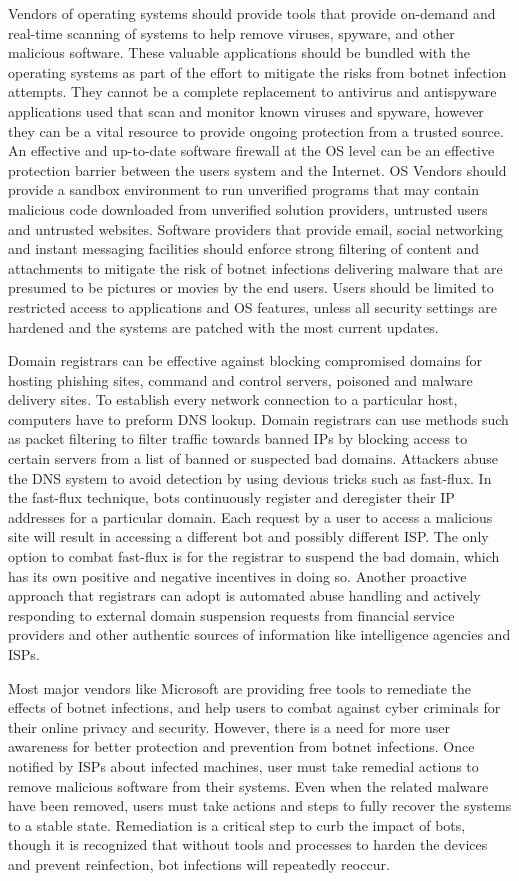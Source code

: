 Vendors of operating systems should provide tools that provide on-demand and real-time scanning of systems to help remove viruses, spyware, and other malicious software. These valuable applications should be bundled with the operating systems as part of the effort to mitigate the risks from botnet infection attempts. They cannot be a complete replacement to antivirus and antispyware applications used that scan and monitor known viruses and spyware, however they can be a vital resource to provide ongoing protection from a trusted source. An effective and up-to-date software firewall at the OS level can be an effective protection barrier between the users system and the Internet. OS Vendors should provide a sandbox environment to run unverified programs that may contain malicious code downloaded from unverified solution providers, untrusted users and untrusted websites. Software providers that provide email, social networking and instant messaging facilities should enforce strong filtering of content and attachments to mitigate the risk of botnet infections delivering malware that are presumed to be pictures or movies by the end users. Users should be limited to restricted access to applications and OS features, unless all security settings are hardened and the systems are patched with the most current updates.	

Domain registrars can be effective against blocking compromised domains for hosting phishing sites, command and control servers, poisoned and malware delivery sites. To establish every network connection to a particular host, computers have to preform DNS lookup. Domain registrars can use methods such as packet filtering to filter traffic towards banned IPs by blocking access to certain servers from a list of banned or suspected bad domains. Attackers abuse the DNS system to avoid detection by using devious tricks such as fast-flux. In the fast-flux technique, bots continuously register and deregister their IP addresses for a particular domain. Each request by a user to access a malicious site will result in accessing a different bot and possibly different ISP. The only option to combat fast-flux is for the registrar to suspend the bad domain, which has its own positive and negative incentives in doing so. Another proactive approach that registrars can adopt is automated abuse handling and actively responding to external domain suspension requests from financial service providers and other authentic sources of information like intelligence agencies and ISPs.

Most major vendors like Microsoft are providing free tools to remediate the effects of botnet infections, and help users to combat against cyber criminals for their online privacy and security. However, there is a need for more user awareness for better protection and prevention from botnet infections. Once notified by ISPs about infected machines, user must take remedial actions to remove malicious software from their systems. Even when the related malware have been removed, users must take actions and steps to fully recover the systems to a stable state. Remediation is a critical step to curb the impact of bots, though it is recognized that without tools and processes to harden the devices and prevent reinfection, bot infections will repeatedly reoccur.

